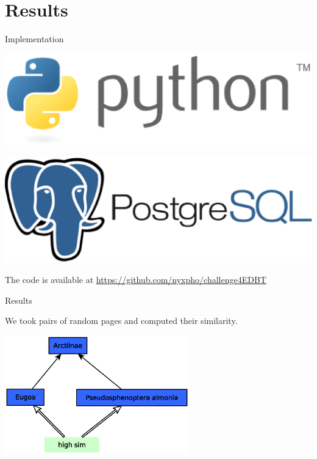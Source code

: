 \documentclass[xcolor=dvipsnames]{beamer}
\begin{document}
\section{Results}
\begin{frame}{Implementation}

\includegraphics[scale=0.15]{media/python-logo.eps}

\bigskip


\includegraphics[scale=0.1]{media/postgres-logo.eps}

\bigskip

The code is available at \url{https://github.com/nyxpho/challenge4EDBT}

\end{frame}

\begin{frame}{Results}

We took pairs of random pages and computed their similarity. 


\begin{center}

\includegraphics[width=0.6\textwidth, height=0.4\paperheight]{media/moths.eps}

\end{center}

\end{frame}
\end{document}
